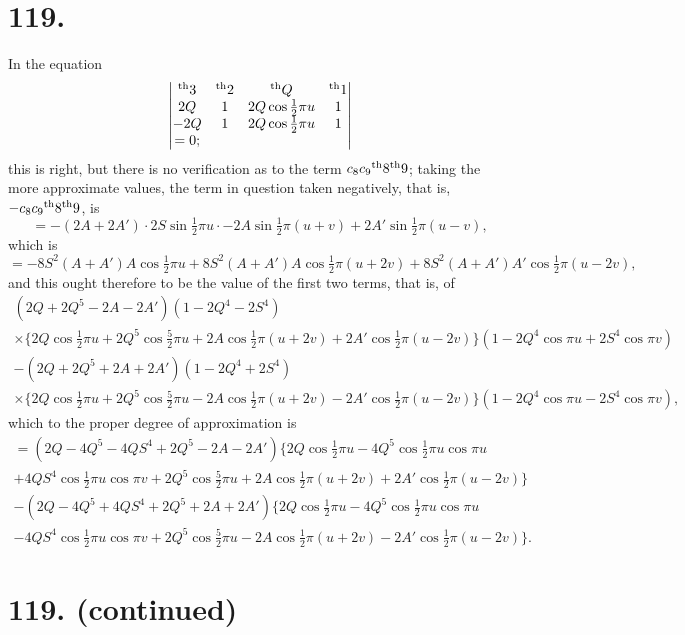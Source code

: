\documentclass[11pt,a4paper]{book}
\providecommand{\uth}{\textsuperscript{th}}
\begin{document}
\newpage
\section*{119.}
\label{sec:119}

In the equation
\[
\begin{vmatrix}
\uth{3} & \uth{2} & \uth{Q} & \uth{1} \\
2Q & 1 & 2Q\cos\tfrac{1}{2}\pi u & 1 \\
-2Q & 1 & 2Q\cos\tfrac{1}{2}\pi u & 1 \\
= 0;
\end{vmatrix}
\]
this is right, but there is no verification as to the term $c_8c_9\uth{8}\uth{9}$; taking the more approximate values, the term in question taken negatively, that is, $-c_8c_9\uth{8}\uth{9}$, is
\[
= -(2A + 2A') \cdot 2S\sin\tfrac{1}{2}\pi u \cdot -2A\sin\tfrac{1}{2}\pi(u+v) + 2A'\sin\tfrac{1}{2}\pi(u-v),
\]
which is
\[
= -8S^2(A + A')A\cos\tfrac{1}{2}\pi u + 8S^2(A + A')A\cos\tfrac{1}{2}\pi(u+2v) + 8S^2(A + A')A'\cos\tfrac{1}{2}\pi(u-2v),
\]
and this ought therefore to be the value of the first two terms, that is, of
\begin{multline*}
(2Q + 2Q^5 - 2A - 2A')(1 - 2Q^4 - 2S^4) \\
\times \{2Q\cos\tfrac{1}{2}\pi u + 2Q^5\cos\tfrac{5}{2}\pi u + 2A\cos\tfrac{1}{2}\pi(u+2v) + 2A'\cos\tfrac{1}{2}\pi(u-2v)\}(1 - 2Q^4\cos\pi u + 2S^4\cos\pi v) \\
- (2Q + 2Q^5 + 2A + 2A')(1 - 2Q^4 + 2S^4) \\
\times \{2Q\cos\tfrac{1}{2}\pi u + 2Q^5\cos\tfrac{5}{2}\pi u - 2A\cos\tfrac{1}{2}\pi(u+2v) - 2A'\cos\tfrac{1}{2}\pi(u-2v)\}(1 - 2Q^4\cos\pi u - 2S^4\cos\pi v),
\end{multline*}
which to the proper degree of approximation is
\begin{multline*}
= (2Q - 4Q^5 - 4QS^4 + 2Q^5 - 2A - 2A') \{2Q\cos\tfrac{1}{2}\pi u - 4Q^5\cos\tfrac{1}{2}\pi u\cos\pi u \\
+ 4QS^4\cos\tfrac{1}{2}\pi u\cos\pi v + 2Q^5\cos\tfrac{5}{2}\pi u + 2A\cos\tfrac{1}{2}\pi(u+2v) + 2A'\cos\tfrac{1}{2}\pi(u-2v)\} \\
- (2Q - 4Q^5 + 4QS^4 + 2Q^5 + 2A + 2A') \{2Q\cos\tfrac{1}{2}\pi u - 4Q^5\cos\tfrac{1}{2}\pi u\cos\pi u \\
- 4QS^4\cos\tfrac{1}{2}\pi u\cos\pi v + 2Q^5\cos\tfrac{5}{2}\pi u - 2A\cos\tfrac{1}{2}\pi(u+2v) - 2A'\cos\tfrac{1}{2}\pi(u-2v)\}.
\end{multline*}

\newpage
\section*{119. (continued)}
\label{sec:119cont}
\end{document}
